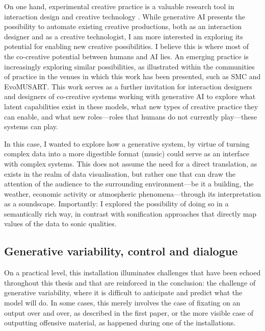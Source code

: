 On one hand, experimental creative practice is a valuable research tool in interaction design \cite{Candy2019-vg, Vear2021-cx} and creative technology \cite{Colton2012-jc, Cohen1995-wt, Cope2000-cq, Reichardt1968-eo}. While generative AI presents the possibility to automate existing creative productions, both as an interaction designer and as a creative technologist, I am more interested in exploring its potential for enabling new creative possibilities. I believe this is where most of the co-creative potential between humans and AI lies. An emerging practice is increasingly exploring similar possibilities, as illustrated within the communities of practice in the venues in which this work has been presented, such as SMC and EvoMUSART. This work serves as a further invitation for interaction designers and designers of co-creative systems working with generative AI to explore what latent capabilities exist in these models, what new types of creative practice they can enable, and what new roles—roles that humans do not currently play—these systems can play.

In this case, I wanted to explore how a generative system, by virtue of turning complex data into a more digestible format (music) could serve as an interface with complex systems. This does not assume the need for a direct translation, as exists in the realm of data visualisation, but rather one that can draw the attention of the audience to the surrounding environment—be it a building, the weather, economic activity or atmospheric phenomena—through its interpretation as a soundscape. Importantly: I explored the possibility of doing so in a semantically rich way, in contrast with sonification approaches that directly map values of the data to sonic qualities. 

\subsection{Generative variability, control and dialogue}

On a practical level, this installation illuminates challenges that have been echoed throughout this thesis and that are reinforced in the conclusion: the challenge of generative variability, where it is difficult to anticipate and predict what the model will do. In some cases, this merely involves the case of fixating on an output over and over, as described in the first paper, or the more visible case of outputting offensive material, as happened during one of the installations.


